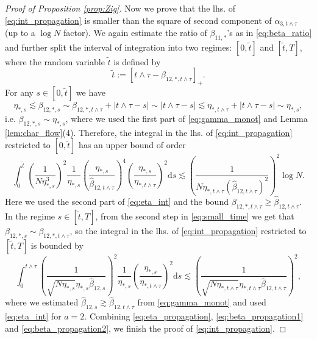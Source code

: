 \documentclass[10pt]{amsart}
\numberwithin{equation}{section}
\newcommand{\dif}{\mathrm{d}}
\begin{document}
\begin{proof}[Proof of Proposition \ref{prop:Zig}]
Now we prove that the lhs. of \eqref{eq:int_propagation} is smaller than the square of second component of $\alpha_{3,t\wedge \tau}$ (up to a $\log N$ factor). We again estimate the ratio of $\beta_{11,*}$'s as in \eqref{eq:beta_ratio} and further split the interval of integration into two regimes: $[0,\widetilde{t}]$ and $[\widetilde{t},T]$, where the random variable $\widetilde{t}$ is defined by
\begin{equation*}
\widetilde{t}:=\left[t\wedge\tau - \beta_{12,*,t\wedge\tau}\right]_+.
\end{equation*}
For any $s\in [0,\widetilde{t}]$ we have
\begin{equation}
\eta_{*,s}\lesssim \beta_{12,*,s}\sim \beta_{12,*,t\wedge\tau}+|t\wedge\tau-s|\sim |t\wedge\tau-s| \lesssim \eta_{*,t\wedge\tau} + |t\wedge\tau-s|\sim \eta_{*,s},
\label{eq:small_time}
\end{equation}
i.e. $\beta_{12,*,s}\sim \eta_{*,s}$, where we used the first part of \eqref{eq:gamma_monot} and Lemma \ref{lem:char_flow}(4). Therefore, the integral in the lhs. of \eqref{eq:int_propagation} restricted to $[0,\widetilde{t}]$ has an upper bound of order
\begin{equation}
\int_0^{\widetilde{t}} \left(\frac{1}{N\eta_{*,s}^3}\right)^2 \frac{1}{\eta_{*,s}}\left(\frac{\eta_{*,s}}{\widehat{\beta}_{12,t\wedge\tau}}\right)^4\left(\frac{\eta_{*,s}}{\eta_{*,t\wedge\tau}}\right)^2\dif s\lesssim \left(\frac{1}{N\eta_{*,t\wedge\tau}(\widehat{\beta}_{12,t\wedge\tau})^2}\right)^2\log N.
\label{eq:beta_propagation1}
\end{equation}
Here we used the second part of \eqref{eq:eta_int} and the bound $\beta_{12,*,t\wedge\tau}\ge \widehat{\beta}_{12,t\wedge\tau}$. In the regime $s\in [\widetilde{t},T]$, from the second step in \eqref{eq:small_time} we get that $\beta_{12,*,s}\sim \beta_{12,*,t\wedge\tau}$, so the integral in the lhs. of \eqref{eq:int_propagation} restricted to $[\widetilde{t}, T]$ is bounded by
\begin{equation}
\int_0^{t\wedge\tau} \left( \frac{1}{\sqrt{N\eta_{*,s}}\eta_{*,s}\widehat{\beta}_{12,s}}\right)^2 \frac{1}{\eta_{*,s}}\left(\frac{\eta_{*,s}}{\eta_{*,t\wedge\tau}}\right)^2\dif s\lesssim \left( \frac{1}{\sqrt{N\eta_{*,t\wedge\tau}}\eta_{*,t\wedge\tau}\widehat{\beta}_{12,t\wedge\tau}}\right)^2,
\label{eq:beta_propagation2}
\end{equation}
where we estimated $\widehat{\beta}_{12,s}\gtrsim \widehat{\beta}_{12,t\wedge\tau}$ from \eqref{eq:gamma_monot} and used \eqref{eq:eta_int} for $a=2$. Combining \eqref{eq:eta_propagation}, \eqref{eq:beta_propagation1} and \eqref{eq:beta_propagation2}, we finish the proof of \eqref{eq:int_propagation}.



\end{proof}
\end{document}
